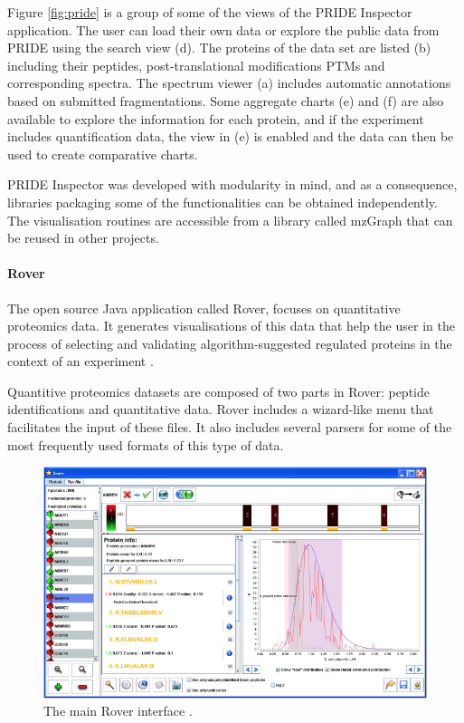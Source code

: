 Figure \ref{fig:pride} is a group of some of the views of the PRIDE Inspector application. The user can load their own data or explore the public data from PRIDE using the search view (d). The proteins of the data set are listed (b) including their peptides, post-translational modifications PTMs and corresponding spectra. The spectrum viewer (a) includes automatic annotations based on submitted fragmentations. Some aggregate charts (e) and (f) are also available to explore the information for each protein, and if the experiment includes quantification data, the view in (e) is enabled and the data can then be used to create comparative charts.

PRIDE Inspector was developed with modularity in mind, and as a consequence, libraries packaging some of the functionalities can be obtained independently. The visualisation routines are accessible from a library called mzGraph that can be reused in other projects.

\paragraph{Rover}
The open source Java application called Rover, focuses on quantitative proteomics data. It generates visualisations of this data that help the user in the process of selecting and validating algorithm-suggested regulated proteins in the context of an experiment \cite{PER2014}.

Quantitive proteomics datasets are composed of two parts in Rover: peptide identifications and quantitative data. Rover includes a wizard-like menu that facilitates the input of these files. It also includes several parsers for some of the most frequently used formats of this type of data.

\begin{figure}  
\centering
\includegraphics[width=\textwidth]{figures/rover.png}
\caption[The main Rover interface.]{The main Rover interface \cite{COL2010}.
\label{fig:rover}}
\end{figure}

